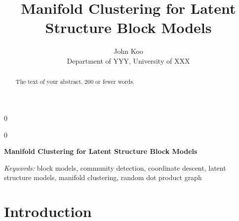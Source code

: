 \documentclass[12pt]{article}
\newcommand{\blind}{0}
\begin{document}
\def\spacingset#1{\renewcommand{\baselinestretch}%
{#1}\small\normalsize} \spacingset{1}



\blind
{
  \title{\bf Manifold Clustering for Latent Structure Block Models}

  \author{
        John Koo \\
    Department of YYY, University of XXX\\
      }
  \maketitle
} \fi

\blind
{
  \bigskip
  \bigskip
  \bigskip
  \begin{center}
    {\LARGE\bf Manifold Clustering for Latent Structure Block Models}
  \end{center}
  \medskip
} \fi

\bigskip
\begin{abstract}
The text of your abstract. 200 or fewer words.
\end{abstract}

\noindent%
{\it Keywords:} block models, community detection, coordinate descent,
latent structure models, manifold clustering, random dot product graph
\vfill

\newpage
\spacingset{1.45} %

\newcommand{\diag}{\mathrm{diag}}
\newcommand{\tr}{\mathrm{Tr}}
\newcommand{\blockdiag}{\mathrm{blockdiag}}
\newcommand{\indep}{\stackrel{\mathrm{ind}}{\sim}}
\newcommand{\iid}{\stackrel{\mathrm{iid}}{\sim}}
\newcommand{\Bernoulli}{\mathrm{Bernoulli}}
\newcommand{\Betadist}{\mathrm{Beta}}
\newcommand{\BG}{\mathrm{BernoulliGraph}}
\newcommand{\Uniform}{\mathrm{Uniform}}
\newcommand{\PABM}{\mathrm{PABM}}
\newcommand{\RDPG}{\mathrm{RDPG}}
\newcommand{\GRDPG}{\mathrm{GRDPG}}
\newcommand{\Multinomial}{\mathrm{Multinomial}}
\newtheorem{theorem}{Theorem}
\newtheorem{lemma}{Lemma}
\newtheorem{proposition}{Proposition}
\theoremstyle{remark}
\newtheorem{remark}{Remark}
\theoremstyle{definition}
\newtheorem{definition}{Definition}
\newtheorem{example}{Example}
\newcommand{\dd}{\mathrm{d}}
\newcommand{\as}{\stackrel{\mathrm{a.s.}}{\to}}
\newcommand{\ER}{\text{Erd\"{o}s-R\'{e}nyi}}

\hypertarget{introduction}{%
\section{Introduction}\label{introduction}}
\end{document}
